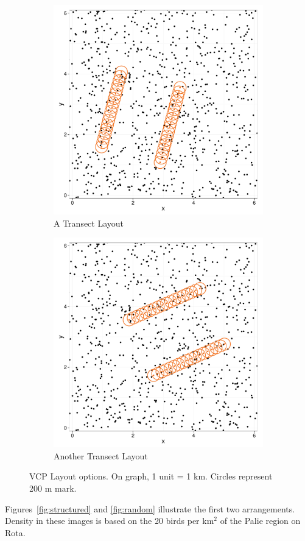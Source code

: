 \documentclass[12pt]{article}
\begin{document}
\begin{figure}
	\begin{subfigure}[b]{0.45\textwidth}
		\includegraphics[width=\textwidth]{../images/layout_rand-sys-4.pdf}
		\caption{A Transect Layout}
		\label{fig:transect1}
	\end{subfigure}
	\begin{subfigure}[b]{0.45\textwidth}
		\includegraphics[width=\textwidth]{../images/layout_rand-sys-6.pdf}
		\caption{Another Transect Layout}
		\label{fig:transect2}
	\end{subfigure}
	\caption{VCP Layout options. On graph, 1 unit = 1 km. Circles represent 200 m mark.}
	\label{fig:layouts}
\end{figure}
Figures~\ref{fig:structured} and \ref{fig:random} illustrate the first two arrangements. Density in these images is based on the 20 birds per km$^2$ of the Palie region on Rota. \parencite{micronesian}
\end{document}
